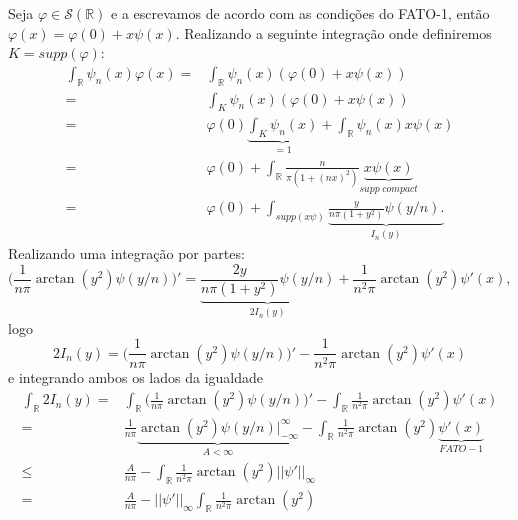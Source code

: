 \documentclass{article}
\begin{document}
\begin{enumerate}
\begin{enumerate}
				Seja $\varphi \in \mathcal{S}(\mathbb{R})$ e a escrevamos de acordo com as condições do FATO-1, então $\varphi(x) = \varphi(0) + x\psi(x)$. Realizando a seguinte integração onde definiremos $K = supp(\varphi)$:
				$$
				\begin{aligned}
				\int_{\mathbb{R}} \psi_{n}(x)\varphi(x) 
				= &\int_{\mathbb{R}} \psi_{n}(x)(\varphi(0) + x\psi(x)) \\
				= &\int_{K} \psi_{n}(x)(\varphi(0) + x\psi(x)) \\
				= & \varphi(0) \underbrace{ \int_{K} \psi_{n}(x) } _{=1}  +  \int_{\mathbb{R}} \psi_{n}(x) x\psi(x) \\
				= & \varphi(0)  +  \int_{\mathbb{R}} \frac{n}{\pi(1+(nx)^{2})} \underbrace{ x\psi(x) }_{supp \; compact} \\
				= & \varphi(0)  +  \int_{supp(x\psi)} \underbrace{ \frac{y}{n\pi(1+y^{2})} \psi(y/n). }_{I_{n}(y)}
				\end{aligned}
				$$
				Realizando uma integração por partes:
				$$
				\Big( \frac{1}{n\pi}\arctan(y^{2}) \psi(y/n) \Big)' = \underbrace{ \frac{2y}{n\pi(1+y^{2})} \psi(y/n) }_{2I_{n}(y)} + \frac{1}{n^{2}\pi}\arctan(y^{2}) \psi'(x),
				$$
				logo
				$$
				2I_{n}(y) = \Big( \frac{1}{n\pi}\arctan(y^{2}) \psi(y/n) \Big)' - \frac{1}{n^{2}\pi}\arctan(y^{2}) \psi'(x)
				$$
				e integrando ambos os lados da igualdade
				$$
				\begin{aligned}
				\int_{\mathbb{R}} 2I_{n}(y) = & \int_{\mathbb{R}} \Big( \frac{1}{n\pi}\arctan(y^{2}) \psi(y/n) \Big)' - \int_{\mathbb{R}} \frac{1}{n^{2}\pi}\arctan(y^{2}) \psi'(x) \\
				= &  \frac{1}{n\pi} \underbrace{ \arctan(y^{2}) \psi(y/n) \Big|^{\infty}_{-\infty} }_{A < \infty}- \int_{\mathbb{R}} \frac{1}{n^{2}\pi}\arctan(y^{2}) \underbrace{ \psi'(x) }_{FATO-1}\\
				\leq &  \frac{A}{n\pi} - \int_{\mathbb{R}} \frac{1}{n^{2}\pi}\arctan(y^{2}) ||\psi'||_{\infty} \\
				= &  \frac{A}{n\pi} - ||\psi'||_{\infty} \int_{\mathbb{R}} \frac{1}{n^{2}\pi}\arctan(y^{2}) \\
				\end{aligned}
				$$
				
			\end{enumerate}
	\end{enumerate}
	
	
\end{document}

